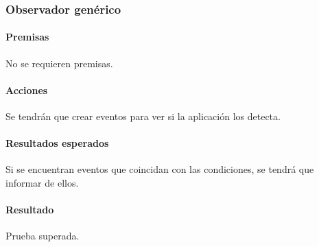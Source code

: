 \subsubsection{Observador genérico}

\paragraph{Premisas}
No se requieren premisas.

\paragraph{Acciones}
Se tendrán que crear eventos para ver si la aplicación los detecta.

\paragraph{Resultados esperados}
Si se encuentran eventos que coincidan con las condiciones, se tendrá que informar de ellos.

\paragraph{Resultado}
Prueba superada.